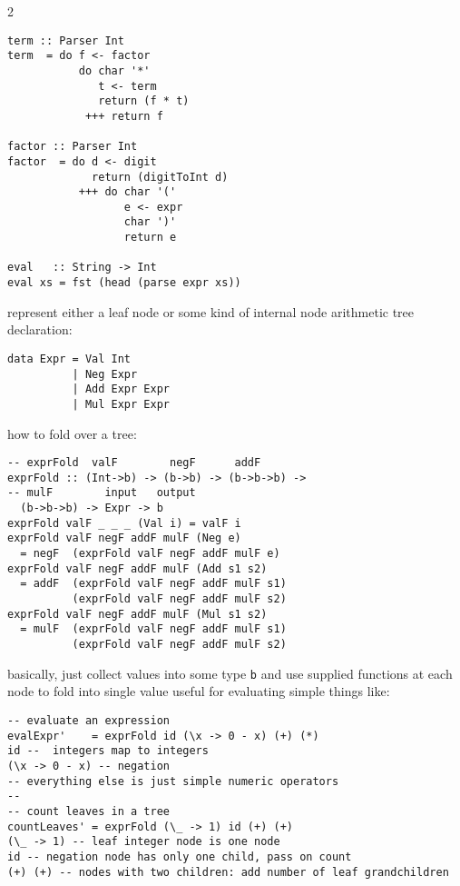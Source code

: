 \documentclass{article}
\def \columncount {2}
\begin{document}
\begin{multicols}{\columncount}
\begin{outline}[longenum]
\begin{verbatim}
term :: Parser Int
term  = do f <- factor
           do char '*'
              t <- term
              return (f * t)
            +++ return f

factor :: Parser Int
factor  = do d <- digit
             return (digitToInt d)
           +++ do char '('
                  e <- expr
                  char ')'
                  return e

eval   :: String -> Int
eval xs = fst (head (parse expr xs))
\end{verbatim}

  \1 represent either a leaf node or some kind of internal node
  \1 arithmetic tree declaration:
\begin{verbatim}
data Expr = Val Int
          | Neg Expr 
          | Add Expr Expr 
          | Mul Expr Expr
\end{verbatim}
  \1 how to fold over a tree:
\begin{verbatim}
-- exprFold  valF        negF      addF     
exprFold :: (Int->b) -> (b->b) -> (b->b->b) ->
-- mulF        input   output
  (b->b->b) -> Expr -> b
exprFold valF _ _ _ (Val i) = valF i
exprFold valF negF addF mulF (Neg e) 
  = negF  (exprFold valF negF addF mulF e)
exprFold valF negF addF mulF (Add s1 s2) 
  = addF  (exprFold valF negF addF mulF s1)
          (exprFold valF negF addF mulF s2)
exprFold valF negF addF mulF (Mul s1 s2) 
  = mulF  (exprFold valF negF addF mulF s1) 
          (exprFold valF negF addF mulF s2)
\end{verbatim}
    \2 basically, just collect values into some type \texttt{b} and use supplied functions at each node to fold into single value
    \2 useful for evaluating simple things like:
\begin{verbatim}
-- evaluate an expression
evalExpr'    = exprFold id (\x -> 0 - x) (+) (*)
id --  integers map to integers
(\x -> 0 - x) -- negation
-- everything else is just simple numeric operators
-- 
-- count leaves in a tree
countLeaves' = exprFold (\_ -> 1) id (+) (+)
(\_ -> 1) -- leaf integer node is one node
id -- negation node has only one child, pass on count
(+) (+) -- nodes with two children: add number of leaf grandchildren
\end{verbatim}


\begin{verbatim}



\end{verbatim}
\end{outline}
\end{multicols}
\end{document}

